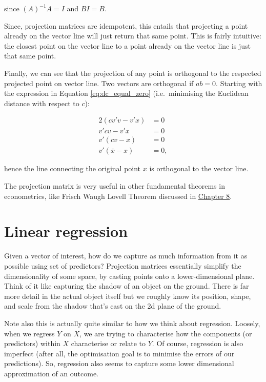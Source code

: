 \documentclass[
]{book}
\begin{document}
since \((A)^{-1}A = I\) and \(BI = B\).

Since, projection matrices are idempotent, this entails that projecting a point already on the vector line will just return that same point. This is fairly intuitive: the closest point on the vector line to a point already on the vector line is just that same point.

Finally, we can see that the projection of any point is orthogonal to the respected projected point on vector line. Two vectors are orthogonal if \(ab = 0\). Starting with the expression in Equation \ref{eq:dc_equal_zero} (i.e.~minimising the Euclidean distance with respect to \(c\)):

\[
\begin{aligned}
2(cv'v - v'x) &= 0 \\ 
v'cv - v'x &= 0 \\
v'(cv-x) &= 0 \\
v'(\bar{x} - x) &= 0,
\end{aligned}
\]

hence the line connecting the original point \(x\) is orthogonal to the vector line.

The projection matrix is very useful in other fundamental theorems in econometrics, like Frisch Waugh Lovell Theorem discussed in \protect\hyperlink{frisch}{Chapter 8}.

\hypertarget{lp_lr}{%
\section{Linear regression}\label{lp_lr}}

Given a vector of interest, how do we capture as much information from it as possible using set of predictors? Projection matrices essentially simplify the dimensionality of some space, by casting points onto a lower-dimensional plane. Think of it like capturing the shadow of an object on the ground. There is far more detail in the actual object itself but we roughly know its position, shape, and scale from the shadow that's cast on the 2d plane of the ground.

Note also this is actually quite similar to how we think about regression. Loosely, when we regress \(Y\) on \(X\), we are trying to characterise how the components (or predictors) within \(X\) characterise or relate to \(Y\). Of course, regression is also imperfect (after all, the optimisation goal is to minimise the errors of our predictions). So, regression also seems to capture some lower dimensional approximation of an outcome.
\end{document}
